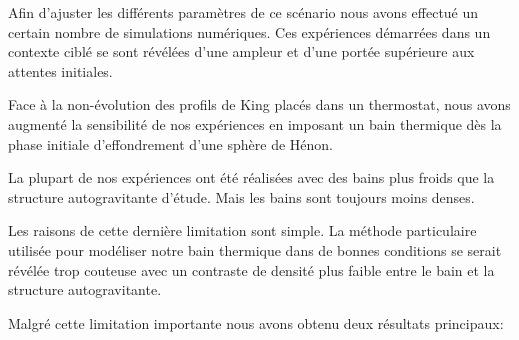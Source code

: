 Afin d'ajuster les différents paramètres de ce scénario nous avons effectué un certain nombre de simulations numériques. Ces expériences démarrées
dans un contexte ciblé se sont révélées d'une ampleur et d'une portée supérieure aux attentes initiales. 



Face à la non-évolution des profils de King placés dans un thermostat, nous avons augmenté la sensibilité de nos  expériences en imposant un bain
thermique dès la phase initiale d'effondrement d'une sphère de Hénon.



La plupart de nos expériences ont été réalisées avec des bains plus froids que la structure autogravitante d'étude. Mais les bains sont toujours moins
denses.

Les raisons de cette dernière limitation sont simple. La méthode particulaire utilisée pour modéliser notre bain
thermique dans de bonnes conditions se serait révélée trop couteuse avec un contraste de densité plus faible entre le bain et la structure
autogravitante.


Malgré cette limitation importante nous avons obtenu deux résultats principaux:


